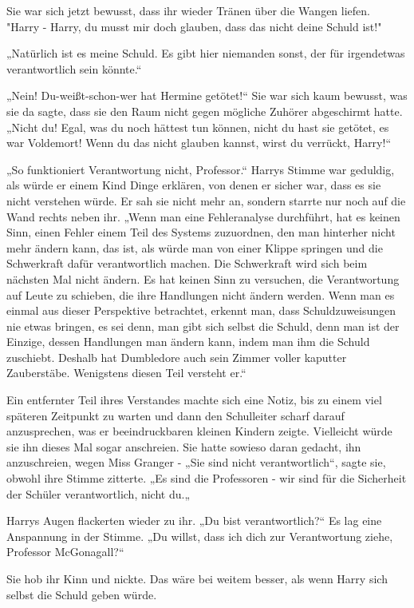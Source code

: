 {Sie war sich jetzt bewusst, dass ihr wieder Tränen über die Wangen liefen.\\ "Harry - Harry, du musst mir doch glauben, dass das nicht deine Schuld ist!"

„Natürlich ist es meine Schuld. Es gibt hier niemanden sonst, der für irgendetwas verantwortlich sein könnte.“

„Nein! Du-weißt-schon-wer hat Hermine getötet!“ Sie war sich kaum bewusst, was sie da sagte, dass sie den Raum nicht gegen mögliche Zuhörer abgeschirmt hatte. „Nicht du! Egal, was du noch hättest tun können, nicht du hast sie getötet, es war Voldemort! Wenn du das nicht glauben kannst, wirst du verrückt, Harry!“

„So funktioniert Verantwortung nicht, Professor.“ Harrys Stimme war geduldig, als würde er einem Kind Dinge erklären, von denen er sicher war, dass es sie nicht verstehen würde. Er sah sie nicht mehr an, sondern starrte nur noch auf die Wand rechts neben ihr. „Wenn man eine Fehleranalyse durchführt, hat es keinen Sinn, einen Fehler einem Teil des Systems zuzuordnen, den man hinterher nicht mehr ändern kann, das ist, als würde man von einer Klippe springen und die Schwerkraft dafür verantwortlich machen. Die Schwerkraft wird sich beim nächsten Mal nicht ändern. Es hat keinen Sinn zu versuchen, die Verantwortung auf Leute zu schieben, die ihre Handlungen nicht ändern werden. Wenn man es einmal aus dieser Perspektive betrachtet, erkennt man, dass Schuldzuweisungen nie etwas bringen, es sei denn, man gibt sich selbst die Schuld, denn man ist der Einzige, dessen Handlungen man ändern kann, indem man ihm die Schuld zuschiebt. Deshalb hat Dumbledore auch sein Zimmer voller kaputter Zauberstäbe. Wenigstens diesen Teil versteht er.“

Ein entfernter Teil ihres Verstandes machte sich eine Notiz, bis zu einem viel späteren Zeitpunkt zu warten und dann den Schulleiter scharf darauf anzusprechen, was er beeindruckbaren kleinen Kindern zeigte. Vielleicht würde sie ihn dieses Mal sogar anschreien. Sie hatte sowieso daran gedacht, ihn anzuschreien, wegen Miss Granger - „Sie sind nicht verantwortlich“, sagte sie, obwohl ihre Stimme zitterte. „Es sind die Professoren - wir sind für die Sicherheit der Schüler verantwortlich, nicht du.„

Harrys Augen flackerten wieder zu ihr. „Du bist verantwortlich?“ Es lag eine Anspannung in der Stimme. „Du willst, dass ich dich zur Verantwortung ziehe, Professor McGonagall?“

Sie hob ihr Kinn und nickte. Das wäre bei weitem besser, als wenn Harry sich selbst die Schuld geben würde.

}
